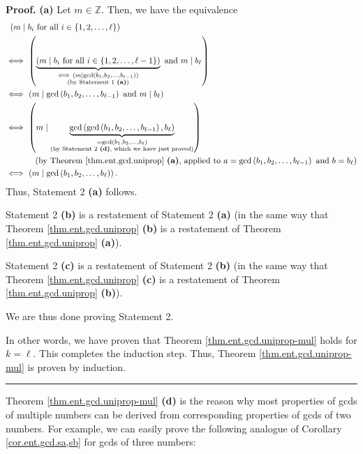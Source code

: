\documentclass[numbers=enddot,12pt,final,onecolumn,notitlepage]{scrartcl}%
\numberwithin{exer}{subsection}
\theoremstyle{definition}
\newenvironment{proof}[1][Proof]{\noindent\textbf{#1.} }{\ \rule{0.5em}{0.5em}}
\begin{document}
\begin{proof}
\textbf{(a)} Let $m\in\mathbb{Z}$. Then, we have the equivalence%
\begin{align*}
&  \ \left(  m\mid b_{i}\text{ for all }i\in\left\{  1,2,\ldots,\ell\right\}
\right) \\
&  \Longleftrightarrow\ \left(  \underbrace{\left(  m\mid b_{i}\text{ for all
}i\in\left\{  1,2,\ldots,\ell-1\right\}  \right)  }%
_{\substack{\Longleftrightarrow\ \left(  m\mid\gcd\left(  b_{1},b_{2}%
,\ldots,b_{\ell-1}\right)  \right)  \\\text{(by Statement 1 \textbf{(a)})}%
}}\text{ and }m\mid b_{\ell}\right) \\
&  \Longleftrightarrow\ \left(  m\mid\gcd\left(  b_{1},b_{2},\ldots,b_{\ell
-1}\right)  \text{ and }m\mid b_{\ell}\right) \\
&  \Longleftrightarrow\ \left(  m\mid\underbrace{\gcd\left(  \gcd\left(
b_{1},b_{2},\ldots,b_{\ell-1}\right)  ,b_{\ell}\right)  }_{\substack{=\gcd
\left(  b_{1},b_{2},\ldots,b_{\ell}\right)  \\\text{(by Statement 2
\textbf{(d)}, which we have just proved)}}}\right) \\
&  \ \ \ \ \ \ \ \ \ \ \left(  \text{by Theorem \ref{thm.ent.gcd.uniprop}
\textbf{(a)}, applied to }a=\gcd\left(  b_{1},b_{2},\ldots,b_{\ell-1}\right)
\text{ and }b=b_{\ell}\right) \\
&  \Longleftrightarrow\ \left(  m\mid\gcd\left(  b_{1},b_{2},\ldots,b_{\ell
}\right)  \right)  .
\end{align*}
Thus, Statement 2 \textbf{(a)} follows.

Statement 2 \textbf{(b)} is a restatement of Statement 2 \textbf{(a)} (in the
same way that Theorem \ref{thm.ent.gcd.uniprop} \textbf{(b)} is a restatement
of Theorem \ref{thm.ent.gcd.uniprop} \textbf{(a)}).

Statement 2 \textbf{(c)} is a restatement of Statement 2 \textbf{(b)} (in the
same way that Theorem \ref{thm.ent.gcd.uniprop} \textbf{(c)} is a restatement
of Theorem \ref{thm.ent.gcd.uniprop} \textbf{(b)}).

We are thus done proving Statement 2.

In other words, we have proven that Theorem \ref{thm.ent.gcd.uniprop-mul}
holds for $k=\ell$. This completes the induction step. Thus, Theorem
\ref{thm.ent.gcd.uniprop-mul} is proven by induction.
\end{proof}

Theorem \ref{thm.ent.gcd.uniprop-mul} \textbf{(d)} is the reason why most
properties of gcds of multiple numbers can be derived from corresponding
properties of gcds of two numbers. For example, we can easily prove the
following analogue of Corollary \ref{cor.ent.gcd.sa,sb} for gcds of three numbers:
\end{document}
